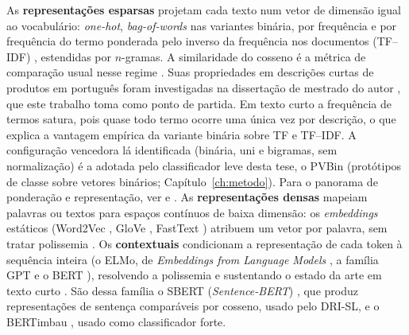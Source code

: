 As \textbf{representações esparsas} projetam cada texto num vetor de
dimensão igual ao vocabulário: \textit{one-hot},
\textit{bag-of-words} nas variantes binária, por frequência e por frequência
do termo ponderada pelo inverso da frequência nos documentos (TF--IDF)
\citep{Salton1988}, estendidas por $n$-gramas. A similaridade do cosseno é a
métrica de comparação usual nesse regime \cite{Baeza2013}. Suas propriedades em
descrições curtas de produtos em português foram investigadas na dissertação
de mestrado do autor \citep{Daru2024Dissertacao}, que este trabalho toma como
ponto de partida. Em texto curto a frequência de termos satura, pois quase
todo termo ocorre uma única vez por descrição, o que explica a vantagem
empírica da variante binária sobre TF e TF--IDF. A configuração vencedora lá
identificada (binária, uni e bigramas, sem normalização) é a adotada pelo
classificador leve desta tese, o PVBin (protótipos de classe sobre vetores
binários; Capítulo~\ref{ch:metodo}). Para o panorama de ponderação e
representação, ver \citet{Salton1988} e \citet{Naseem2021WordRep}.
As \textbf{representações densas} mapeiam palavras ou textos para espaços
contínuos de baixa dimensão: os \textit{embeddings} estáticos (Word2Vec
\cite{Mikolov2013}, GloVe \cite{Pennington2014}, FastText
\cite{Bojanowski2017}) atribuem um vetor por palavra, sem tratar polissemia
\cite{Birunda2021, Goldberg2017}. Os \textbf{contextuais} condicionam a
representação de cada token à sequência inteira (o ELMo, de
\textit{Embeddings from Language Models} \cite{Peters2018}, a
família GPT \cite{Radford2018, Radford2019} e o BERT \cite{Devlin2019}),
resolvendo a polissemia e sustentando o estado da arte em texto curto
\cite{Ahmed2022, Li2020, Karl2023}. São dessa família o SBERT
(\textit{Sentence-BERT}) \citep{Reimers2019SBERT}, que produz representações
de sentença comparáveis por cosseno, usado pelo DRI-SL, e o BERTimbau
\cite{Souza2020BERTimbau}, usado como classificador forte.

